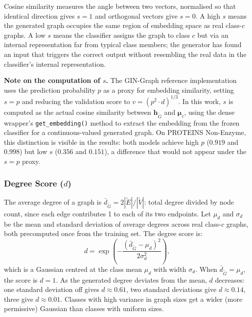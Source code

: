 \documentclass[12pt,a4paper]{article}
\begin{document}
Cosine similarity measures the angle between two vectors, normalised so that identical direction gives $s = 1$ and orthogonal vectors give $s = 0$. A high $s$ means the generated graph occupies the same region of embedding space as real class-$c$ graphs. A low $s$ means the classifier assigns the graph to class $c$ but via an internal representation far from typical class members; the generator has found an input that triggers the correct output without resembling the real data in the classifier's internal representation.

\textbf{Note on the computation of $s$.} The GIN-Graph reference implementation~\cite{sun2025gingraph} uses the prediction probability $p$ as a proxy for embedding similarity, setting $s = p$ and reducing the validation score to $v = (p^2 \cdot d)^{1/3}$. In this work, $s$ is computed as the actual cosine similarity between $\mathbf{h}_{\tilde{G}}$ and $\boldsymbol{\mu}_c$, using the dense wrapper's \texttt{get\_embedding()} method to extract the embedding from the frozen classifier for a continuous-valued generated graph. On PROTEINS Non-Enzyme, this distinction is visible in the results: both models achieve high $p$ ($0.919$ and $0.998$) but low $s$ ($0.356$ and $0.151$), a difference that would not appear under the $s = p$ proxy.

\subsubsection{Degree Score ($d$)}

The average degree of a graph is $\bar{d}_{\tilde{G}} = 2|\tilde{E}| / |\tilde{V}|$: total degree divided by node count, since each edge contributes 1 to each of its two endpoints. Let $\mu_d$ and $\sigma_d$ be the mean and standard deviation of average degrees across real class-$c$ graphs, both precomputed once from the training set. The degree score is:
\begin{equation}
  d = \exp\!\left(-\frac{(\bar{d}_{\tilde{G}} - \mu_d)^2}{2\sigma_d^2}\right),
  \label{eq:degree}
\end{equation}
which is a Gaussian centred at the class mean $\mu_d$ with width $\sigma_d$. When $\bar{d}_{\tilde{G}} = \mu_d$, the score is $d = 1$. As the generated degree deviates from the mean, $d$ decreases: one standard deviation off gives $d \approx 0.61$, two standard deviations give $d \approx 0.14$, three give $d \approx 0.01$. Classes with high variance in graph sizes get a wider (more permissive) Gaussian than classes with uniform sizes.
\end{document}
